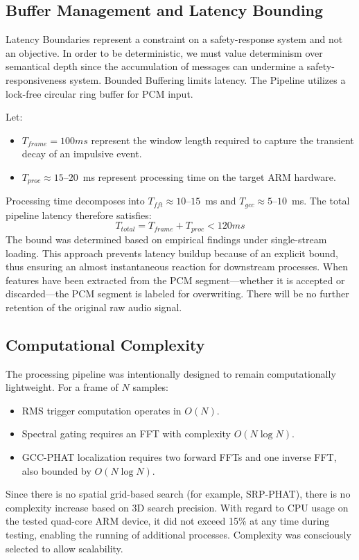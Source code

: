 \documentclass[conference]{IEEEtran}
\begin{document}
\subsection{Buffer Management and Latency Bounding}
Latency Boundaries represent a constraint on a safety-response system and not an objective. In order to be deterministic, we must value determinism over semantical depth since the accumulation of messages can undermine a safety-responsiveness system. Bounded Buffering limits latency. The Pipeline utilizes a lock-free circular ring buffer for PCM input.

Let:
\begin{itemize}
    \item $T_{frame} = 100ms$ represent the window length required to capture the transient decay of an impulsive event.
    \item $T_{proc} \approx 15$--$20$~ms represent processing time on the target ARM hardware.
\end{itemize}

Processing time decomposes into $T_{fft} \approx 10$--$15$~ms and $T_{gcc} \approx 5$--$10$~ms. The total pipeline latency therefore satisfies:
\begin{equation}
T_{total} = T_{frame} + T_{proc} < 120ms
\end{equation}
The bound was determined based on empirical findings under single-stream loading. This approach prevents latency buildup because of an explicit bound, thus ensuring an almost instantaneous reaction for downstream processes. When features have been extracted from the PCM segment—whether it is accepted or discarded—the PCM segment is labeled for overwriting. There will be no further retention of the original raw audio signal.

\subsection{Computational Complexity}
The processing pipeline was intentionally designed to remain computationally lightweight. For a frame of $N$ samples:
\begin{itemize}
    \item RMS trigger computation operates in $O(N)$.
    \item Spectral gating requires an FFT with complexity $O(N \log N)$.
    \item GCC-PHAT localization requires two forward FFTs and one inverse FFT, also bounded by $O(N \log N)$.
\end{itemize}
Since there is no spatial grid-based search (for example, SRP-PHAT), there is no complexity increase based on 3D search precision. With regard to CPU usage on the tested quad-core ARM device, it did not exceed 15\% at any time during testing, enabling the running of additional processes. Complexity was consciously selected to allow scalability.
\end{document}
